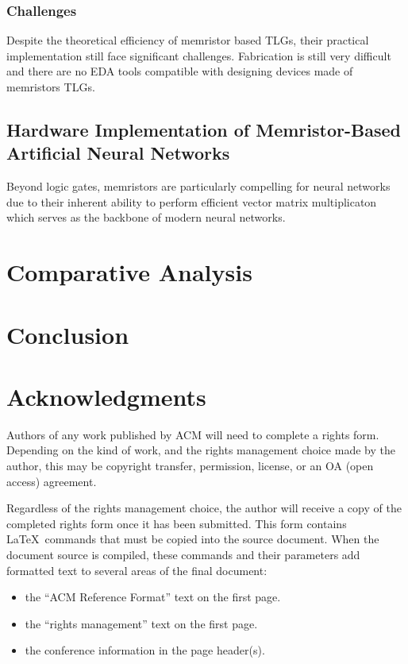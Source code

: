 \documentclass[sigconf,authordraft]{acmart}
\begin{document}
\subsubsection{Challenges}
Despite the theoretical efficiency of memristor based TLGs, 
their practical implementation still face significant challenges. 
Fabrication is still very difficult and there are no EDA tools 
compatible with designing devices made of memristors TLGs. 

\subsection{Hardware Implementation of Memristor-Based Artificial Neural Networks}
Beyond logic gates, memristors are particularly compelling for 
neural networks due to their inherent ability to perform efficient 
vector matrix multiplicaton which serves as the backbone of 
modern neural networks. 



\section{Comparative Analysis}

\section{Conclusion}

\section{Acknowledgments}

Authors of any work published by ACM will need to complete a rights
form. Depending on the kind of work, and the rights management choice
made by the author, this may be copyright transfer, permission,
license, or an OA (open access) agreement.

Regardless of the rights management choice, the author will receive a
copy of the completed rights form once it has been submitted. This
form contains \LaTeX\ commands that must be copied into the source
document. When the document source is compiled, these commands and
their parameters add formatted text to several areas of the final
document:
\begin{itemize}
\item the ``ACM Reference Format'' text on the first page.
\item the ``rights management'' text on the first page.
\item the conference information in the page header(s).
\end{itemize}
\end{document}
